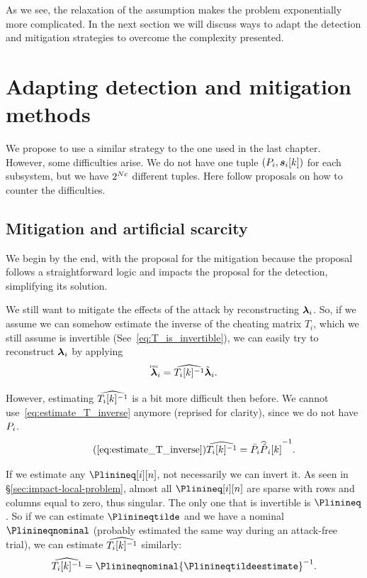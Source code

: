 \documentclass[../main.tex]{subfiles}
\begin{document}
As we see, the relaxation of the assumption makes the problem exponentially more complicated.
In the next section we will discuss ways to adapt the detection and mitigation strategies to overcome the complexity presented.

\section{Adapting detection and mitigation methods}\label{sec:detection-mitigation}

We propose to use a similar strategy to the one used in the last chapter.
However, some difficulties arise.
We do not have one tuple $({P}_{i},\boldsymbol{s}_{i}[k])$ for each subsystem, but we have $2^{N c}$ different tuples.
Here follow proposals on how to counter the difficulties.

\subsection{Mitigation and artificial scarcity}\label{sec:mitigation_ineq}
We begin by the end, with the proposal for the mitigation because the proposal follows a straightforward logic and impacts the proposal for the detection, simplifying its solution.

We still want to mitigate the effects of the attack by reconstructing $\boldsymbol{\lambda}_{i}$.
So, if we assume we can somehow estimate the inverse of the cheating matrix $T_{i}$, which we still assume is invertible (See~\eqref{eq:T_is_invertible}), we can easily try to reconstruct $\boldsymbol{\lambda}_{i}$ by applying
\begin{equation}
  \label{eq:lambda_reconstruction}
  \accentset{\text{rec}}{\boldsymbol{\lambda}}_{i}=\widehat{T_{i}[k]^{-1}} \tilde{\boldsymbol{\lambda}}_{i}.
\end{equation}

However, estimating $\widehat{T_{i}[k]^{-1}}$ is a bit more difficult then before.
We cannot use~\eqref{eq:estimate_T_inverse} anymore (reprised for clarity), since we do not have ${P}_{i}$.
\begin{equation}
  \label{eq:estimate_T_inverse_reprise}
  \tag{\ref*{eq:estimate_T_inverse}}
  {\Tikinvestimate=\Plinnominal{\Plintildeestimate}^{-1}}.
\end{equation}

If we estimate any $\Plinineq[i][n]$, not necessarily we can invert it.
As seen in \S\ref{sec:impact-local-problem}, almost all $\Plinineq[i][n]$ are sparse with rows and columns equal to zero, thus singular.
The only one that is invertible is $\Plinineq$.
So if we can estimate $\Plinineqtilde$ and we have a nominal $\Plinineqnominal$ (probably estimated the same way during an attack-free trial), we can estimate $\widehat{T_{i}[k]^{-1}}$ similarly:
\begin{equation}
  \label{eq:estimate_T_inverse_ineq}
  {\Tikinvestimate=\Plinineqnominal{\Plinineqtildeestimate}^{-1}}.
\end{equation}
\end{document}
